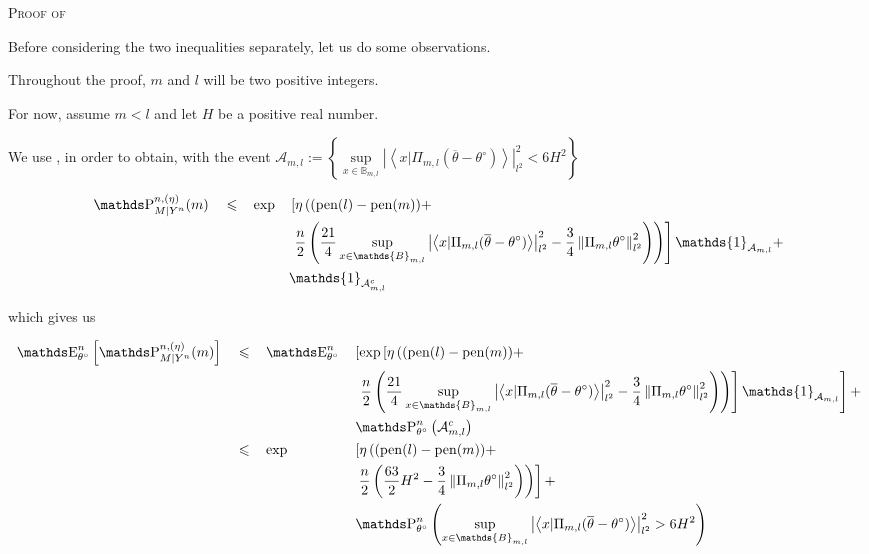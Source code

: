 \begin{pro}{\textsc{Proof of } \\}\label{PROD.5.3}

Before considering the two inequalities separately, let us do some observations.

Throughout the proof, $m$ and $l$ will be two positive integers.

For now, assume $m < l$ and let $H$ be a positive real number.

We use ,  in order to obtain, with the event $\mathcal{A}_{m, l} := \left\{ \sup\limits_{x \in \mathds{B}_{m, l}} \left\vert \left\langle x \vert \Pi_{m, l} (\overline{\theta} - \theta^{\circ}) \right\rangle \right\vert_{l^{2}}^{2} < 6H^{2} \right\}$

\begin{alignat*}{4}
& \P_{M \vert Y^{n}}^{n, (\eta)}(m) && \leq && \exp &&\left[\eta\left((\pen(l)-\pen(m)) +\right.\right.\\
& && && && \left.\left. \frac{n}{2} \left( \frac{21}{4} \sup\limits_{x \in \mathds{B}_{m, l}} \left\vert \left\langle x \vert \Pi_{m, l} (\overline{\theta} - \theta^{\circ}) \right\rangle \right\vert_{l^{2}}^{2} - \frac{3}{4} \left\Vert \Pi_{m, l} \theta^{\circ} \right\Vert_{l^{2}}^{2} \right) \right)\right] \mathds{1}_{\mathcal{A}_{m, l}} +\\
& && && && \mathds{1}_{\mathcal{A}_{m, l}^{c}}
\end{alignat*}

which gives us

\begin{alignat*}{4}
& \E_{\theta^{\circ}}^{n}\left[\P_{M \vert Y^{n}}^{n, (\eta)}(m)\right]&& \leq && \E_{\theta^{\circ}}^{n} && \left[\exp\left[\eta\left((\pen(l)-\pen(m)) +\right.\right.\right.\notag\\
& && && && \left.\left.\left. \frac{n}{2} \left( \frac{21}{4} \sup\limits_{x \in \mathds{B}_{m, l}} \left\vert \left\langle x \vert \Pi_{m, l} (\overline{\theta} - \theta^{\circ}) \right\rangle \right\vert_{l^{2}}^{2} - \frac{3}{4} \left\Vert \Pi_{m, l} \theta^{\circ} \right\Vert_{l^{2}}^{2} \right) \right)\right]\mathds{1}_{\mathcal{A}_{m, l}} \right] + \\
& && && &&\P_{\theta^{\circ}}^{n}\left(\mathcal{A}_{m, l}^{c}\right)\\
& && \leq && \exp && \left[\eta\left((\pen(l)-\pen(m)) +\right.\right.\\
& && && && \left.\left. \frac{n}{2} \left( \frac{63}{2} H^{2} - \frac{3}{4} \left\Vert \Pi_{m, l} \theta^{\circ} \right\Vert_{l^{2}}^{2} \right) \right)\right] + \notag\\
& && && && \P_{\theta^{\circ}}^{n}\left(\sup\limits_{x \in \mathds{B}_{m, l}} \left\vert \left\langle x \vert \Pi_{m, l} (\overline{\theta} - \theta^{\circ}) \right\rangle \right\vert_{l^{2}}^{2} > 6H^{2}\right)
\end{alignat*}


\end{pro}

